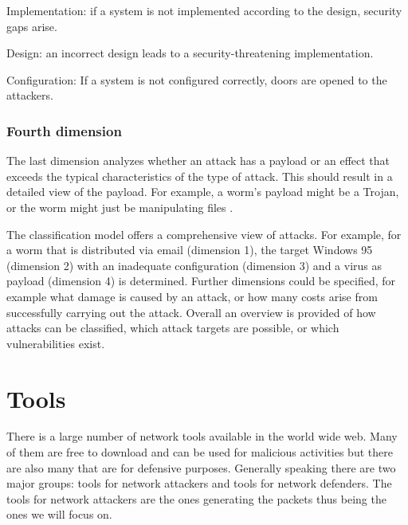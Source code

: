 \documentclass[conference]{IEEEtran}
\begin{document}
\smallskip Implementation: if a system is not implemented according to the design, security gaps arise.

\smallskip Design: an incorrect design leads to a security-threatening implementation.

\smallskip Configuration: If a system is not configured correctly, doors are opened to the attackers.

\medskip \subsubsection{Fourth dimension}The last dimension analyzes whether an attack has a payload or an effect that exceeds the typical characteristics of the type of attack. This should result in a detailed view of the payload. For example, a worm's payload might be a Trojan, or the worm might just be manipulating files \cite{b5}.

\medskip The classification model offers a comprehensive view of attacks. For example, for a worm that is distributed via email (dimension 1), the target Windows 95 (dimension 2) with an inadequate configuration (dimension 3) and a virus as payload (dimension 4) is determined. Further dimensions could be specified, for example what damage is caused by an attack, or how many costs arise from successfully carrying out the attack. Overall an overview is provided of how attacks can be classified, which attack targets are possible, or which vulnerabilities exist.


\section{Tools}

There is a large number of network tools available in the world wide web. Many of them are free to download and can be used for malicious activities but there are also many that are for defensive purposes. Generally speaking there are two major groups: tools for network attackers and tools for network defenders.\cite{b1} The tools for network attackers are the ones generating the packets thus being the ones we will focus on. 
\end{document}
